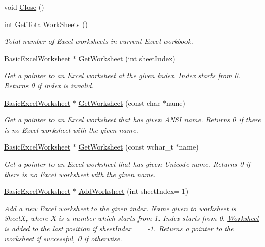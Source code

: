 \begin{DoxyCompactItemize}
void \hyperlink{class_y_excel_1_1_basic_excel_ae0ffc1f6832f34333714d515c4bc9ea9}{Close} ()
\item 
int \hyperlink{class_y_excel_1_1_basic_excel_ad9d06961e6c38fe49aafaf4b46950aee}{Get\+Total\+Work\+Sheets} ()
\begin{DoxyCompactList}\small\item\em Total number of Excel worksheets in current Excel workbook. \end{DoxyCompactList}\item 
\hyperlink{class_y_excel_1_1_basic_excel_worksheet}{Basic\+Excel\+Worksheet} $\ast$ \hyperlink{class_y_excel_1_1_basic_excel_ad1d740905525bdfb266b15c3537cf261}{Get\+Worksheet} (int sheet\+Index)
\begin{DoxyCompactList}\small\item\em Get a pointer to an Excel worksheet at the given index. Index starts from 0. Returns 0 if index is invalid. \end{DoxyCompactList}\item 
\hyperlink{class_y_excel_1_1_basic_excel_worksheet}{Basic\+Excel\+Worksheet} $\ast$ \hyperlink{class_y_excel_1_1_basic_excel_aabfe37c1515cd2ecbf73b8af37ca24bf}{Get\+Worksheet} (const char $\ast$name)
\begin{DoxyCompactList}\small\item\em Get a pointer to an Excel worksheet that has given A\+N\+S\+I name. Returns 0 if there is no Excel worksheet with the given name. \end{DoxyCompactList}\item 
\hyperlink{class_y_excel_1_1_basic_excel_worksheet}{Basic\+Excel\+Worksheet} $\ast$ \hyperlink{class_y_excel_1_1_basic_excel_ac457d7532b76c2424290e20f4065221a}{Get\+Worksheet} (const wchar\+\_\+t $\ast$name)
\begin{DoxyCompactList}\small\item\em Get a pointer to an Excel worksheet that has given Unicode name. Returns 0 if there is no Excel worksheet with the given name. \end{DoxyCompactList}\item 
\hyperlink{class_y_excel_1_1_basic_excel_worksheet}{Basic\+Excel\+Worksheet} $\ast$ \hyperlink{class_y_excel_1_1_basic_excel_a82ab7163a7f12bed534234a75e381597}{Add\+Worksheet} (int sheet\+Index=-\/1)
\begin{DoxyCompactList}\small\item\em Add a new Excel worksheet to the given index. Name given to worksheet is Sheet\+X, where X is a number which starts from 1. Index starts from 0. \hyperlink{class_y_excel_1_1_worksheet}{Worksheet} is added to the last position if sheet\+Index == -\/1. Returns a pointer to the worksheet if successful, 0 if otherwise. \end{DoxyCompactList}\item 

\end{DoxyCompactItemize}
